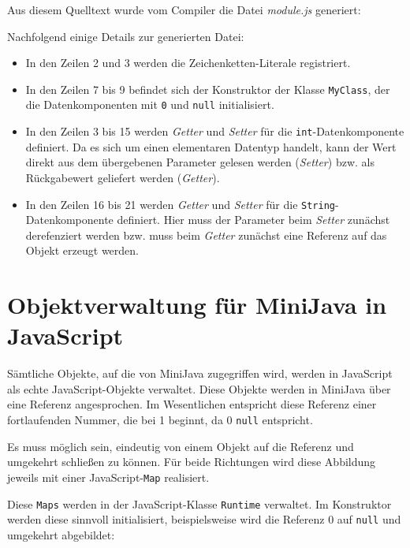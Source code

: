 Aus diesem Quelltext wurde vom Compiler die Datei \emph{module.js} generiert:



Nachfolgend einige Details zur generierten Datei:

\begin{itemize}
    \item In den Zeilen 2 und 3 werden die Zeichenketten-Literale registriert. 
    \item In den Zeilen 7 bis 9 befindet sich der Konstruktor der Klasse \lstinline{MyClass}, der die Datenkomponenten mit \lstinline{0} und \lstinline{null} initialisiert.
    \item In den Zeilen 3 bis 15 werden \emph{Getter} und \emph{Setter} für die \lstinline{int}-Datenkomponente definiert. Da es sich um einen elementaren Datentyp handelt, kann der Wert direkt aus dem übergebenen Parameter gelesen werden (\emph{Setter}) bzw. als Rückgabewert geliefert werden (\emph{Getter}).
    \item In den Zeilen 16 bis 21 werden \emph{Getter} und \emph{Setter} für die \lstinline{String}-Datenkomponente definiert. Hier muss der Parameter beim \emph{Setter} zunächst derefenziert werden bzw. muss beim \emph{Getter} zunächst eine Referenz auf das Objekt erzeugt werden.
\end{itemize}

\section{Objektverwaltung für MiniJava in JavaScript}

Sämtliche Objekte, auf die von MiniJava zugegriffen wird, werden in JavaScript als echte JavaScript-Objekte verwaltet. Diese Objekte werden in MiniJava über eine Referenz angesprochen. Im Wesentlichen entspricht diese Referenz einer fortlaufenden Nummer, die bei 1 beginnt, da 0 \lstinline{null} entspricht.

Es muss möglich sein, eindeutig von einem Objekt auf die Referenz und umgekehrt schließen zu können. Für beide Richtungen wird diese Abbildung jeweils mit einer Java\-Script-\lstinline{Map} realisiert.

Diese \lstinline{Maps} werden in der JavaScript-Klasse \lstinline{Runtime} verwaltet. Im Konstruktor werden diese sinnvoll initialisiert, beispielsweise wird die Referenz 0 auf \lstinline{null} und umgekehrt abgebildet:



